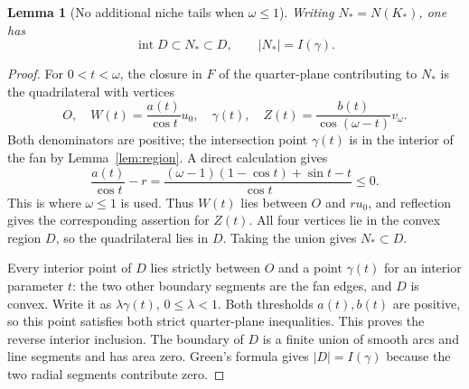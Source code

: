 \documentclass[11pt]{article}
\newtheorem{lemma}[theorem]{Lemma}
\theoremstyle{remark}\newtheorem{remark}[theorem]{Remark}
\newcommand{\area}[1]{\lvert #1\rvert}
\begin{document}
\begin{lemma}[No additional niche tails when $\omega\le1$]\label{lem:no-tail}
Writing $N_*=N(K_*)$, one has
\[
 \operatorname{int}D\subset N_*\subset D,\qquad \area{N_*}=I(\gamma).
\]
\end{lemma}
\begin{proof}
For $0<t<\omega$, the closure in $F$ of the quarter-plane contributing to $N_*$ is the quadrilateral with vertices
\[
 O,\quad W(t)=\frac{a(t)}{\cos t}u_0,\quad\gamma(t),\quad
 Z(t)=\frac{b(t)}{\cos(\omega-t)}v_\omega.
\]
Both denominators are positive; the intersection point $\gamma(t)$ is in the interior of the fan by Lemma~\ref{lem:region}. A direct calculation gives
\[
 \frac{a(t)}{\cos t}-r
 =\frac{(\omega-1)(1-\cos t)+\sin t-t}{\cos t}\le0.
\]
This is where $\omega\le1$ is used. Thus $W(t)$ lies between $O$ and $r u_0$, and reflection gives the corresponding assertion for $Z(t)$. All four vertices lie in the convex region $D$, so the quadrilateral lies in $D$. Taking the union gives $N_*\subset D$.

Every interior point of $D$ lies strictly between $O$ and a point $\gamma(t)$ for an interior parameter $t$: the two other boundary segments are the fan edges, and $D$ is convex. Write it as $\lambda\gamma(t)$, $0\le\lambda<1$. Both thresholds $a(t),b(t)$ are positive, so this point satisfies both strict quarter-plane inequalities. This proves the reverse interior inclusion. The boundary of $D$ is a finite union of smooth arcs and line segments and has area zero. Green's formula gives $\area D=I(\gamma)$ because the two radial segments contribute zero.
\end{proof}
\end{document}
